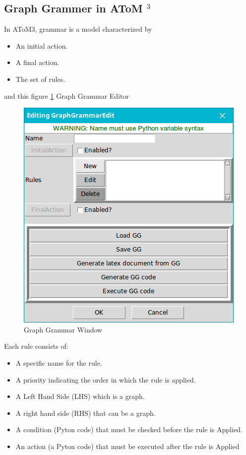 \subsection{Graph Grammer in AToM $^{3}$ }
In AToM3, grammar is a model characterized by
\begin{itemize}
\newcommand{\localtextbulletone}{\textcolor{gray}{\raisebox{.45ex}{\rule{.6ex}{.6ex}}}}
\renewcommand{\labelitemi}{\localtextbulletone}
\item An initial action.
\item A final action.
\item The set of rules. 
\end{itemize}
and this figure \ref{fig:Graph Grammar Window} Graph Grammar Editor
 
\begin{figure}[th]
	\centering 
	\includegraphics[scale=0.5]{ch3/img/GraphGrammar}
	\caption{\label{fig:Graph Grammar Window}Graph Grammar Window}
\end{figure} 
 

 Each rule consists of: 
\begin{itemize}
\newcommand{\localtextbulletone}{\textcolor{gray}{\raisebox{.45ex}{\rule{.6ex}{.6ex}}}}
\renewcommand{\labelitemi}{\localtextbulletone}
\item  A specific name for the rule.
\item  A priority indicating the order in which the rule is applied.
\item  A Left Hand Side (LHS) which is a graph.
\item  A right hand side (RHS) that can be a graph.
\item  A condition (Pyton code) that must be checked before the rule is
Applied.
\item An action (a Pyton code) that must be executed after the rule is
Applied
\end{itemize}


